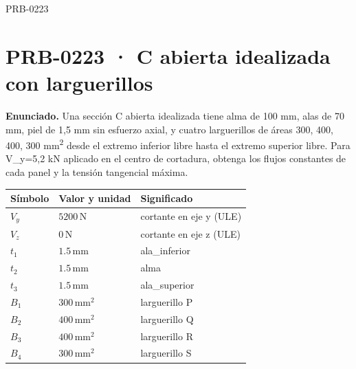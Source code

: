 \begin{studiumworked}{PRB-0223}

\section{PRB-0223 · C abierta idealizada con larguerillos}

\textbf{Enunciado.} Una sección C abierta idealizada tiene alma de 100 mm, alas de 70 mm, piel de 1,5 mm sin esfuerzo axial, y cuatro larguerillos de áreas 300, 400, 400, 300 mm\textsuperscript{2} desde el extremo inferior libre hasta el extremo superior libre. Para V\_y=5,2 kN aplicado en el centro de cortadura, obtenga los flujos constantes de cada panel y la tensión tangencial máxima.

\par\medskip\noindent\begin{tabular}{@{}p{.18\linewidth}p{.26\linewidth}p{.48\linewidth}@{}}
\toprule Símbolo & Valor y unidad & Significado\\\midrule
$V_{y}$ & $5200\,\mathrm{N}$ & cortante en eje y (ULE)\\
$V_{z}$ & $0\,\mathrm{N}$ & cortante en eje z (ULE)\\
$t_{1}$ & $1.5\,\mathrm{mm}$ & ala\_inferior\\
$t_{2}$ & $1.5\,\mathrm{mm}$ & alma\\
$t_{3}$ & $1.5\,\mathrm{mm}$ & ala\_superior\\
$B_{1}$ & $300\,\mathrm{mm^2}$ & larguerillo P\\
$B_{2}$ & $400\,\mathrm{mm^2}$ & larguerillo Q\\
$B_{3}$ & $400\,\mathrm{mm^2}$ & larguerillo R\\
$B_{4}$ & $300\,\mathrm{mm^2}$ & larguerillo S\\
\bottomrule\end{tabular}\par\medskip


\end{studiumworked}
